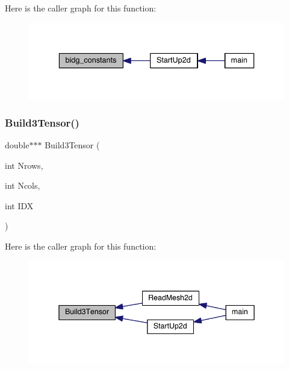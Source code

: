 Here is the caller graph for this function\+:\nopagebreak
\begin{figure}[H]
\begin{center}
\leavevmode
\includegraphics[width=336pt]{a00554_a45390a77c9093b8b1144623da67508c8_icgraph}
\end{center}
\end{figure}
\mbox{\label{a00554_a6031ee45d6b3d95665a885b7128c311c}} 
\subsubsection{\texorpdfstring{Build3\+Tensor()}{Build3Tensor()}}
{\footnotesize\ttfamily double$\ast$$\ast$$\ast$ Build3\+Tensor (\begin{DoxyParamCaption}\item[{int}]{Nrows,  }\item[{int}]{Ncols,  }\item[{int}]{I\+DX }\end{DoxyParamCaption})}

Here is the caller graph for this function\+:\nopagebreak
\begin{figure}[H]
\begin{center}
\leavevmode
\includegraphics[width=342pt]{a00554_a6031ee45d6b3d95665a885b7128c311c_icgraph}
\end{center}
\end{figure}
\mbox{\label{a00554_a745a480f3faf250c87406ddb1d8d0e4f}} 
